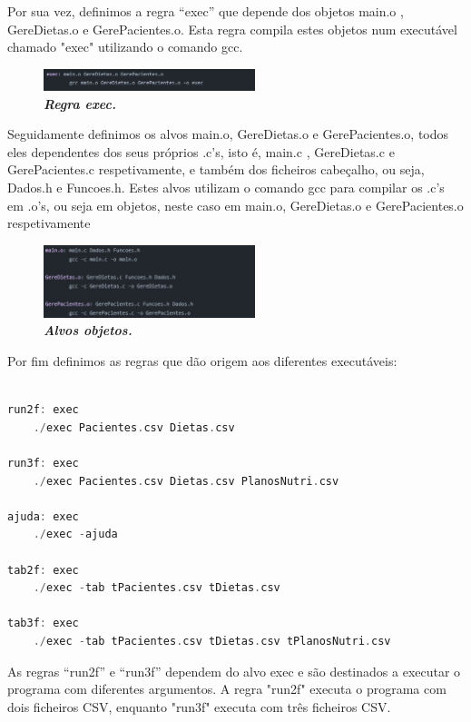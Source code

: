 \documentclass[a4wide]{report}
\begin{document}
{{{{\newpage
Por sua vez, definimos a regra “exec” que depende dos objetos main.o , GereDietas.o e GerePacientes.o. Esta regra compila estes objetos num executável chamado "exec" utilizando o comando gcc.

\begin{figure}[hbt]
    \centering
    \includegraphics[width=0.55\textwidth]{figura8.png}
    \caption{\textbf{\textit{Regra exec.}}\label{fig:imagem}}
\end{figure}

Seguidamente definimos os alvos main.o, GereDietas.o e GerePacientes.o, todos eles dependentes dos seus próprios .c’s, isto é, main.c , GereDietas.c e GerePacientes.c respetivamente, e também dos ficheiros cabeçalho, ou seja, Dados.h e Funcoes.h. Estes alvos utilizam o comando gcc para compilar os .c’s em .o’s, ou seja em objetos, neste caso em main.o, GereDietas.o e GerePacientes.o respetivamente

\begin{figure}[hbt]
    \centering
    \includegraphics[width=0.55\textwidth]{figura9.png}
    \caption{\textbf{\textit{Alvos objetos.}}\label{fig:imagem}}
\end{figure}


Por fim definimos as regras que dão origem aos diferentes executáveis:  
\\
\begin{lstlisting}[language=C, caption={Regras que dão origem aos diferentes executácveis}, label={lst:exemplo-c}]

run2f: exec
	./exec Pacientes.csv Dietas.csv

run3f: exec
	./exec Pacientes.csv Dietas.csv PlanosNutri.csv

ajuda: exec
	./exec -ajuda 

tab2f: exec
	./exec -tab tPacientes.csv tDietas.csv

tab3f: exec 
	./exec -tab tPacientes.csv tDietas.csv tPlanosNutri.csv

\end{lstlisting}

\newpage
As regras “run2f” e “run3f” dependem do alvo exec e são destinados a executar o programa com diferentes argumentos. A regra "run2f" executa o programa com dois ficheiros CSV, enquanto "run3f" executa com três ficheiros CSV. 
\\

}}}}
\end{document}
